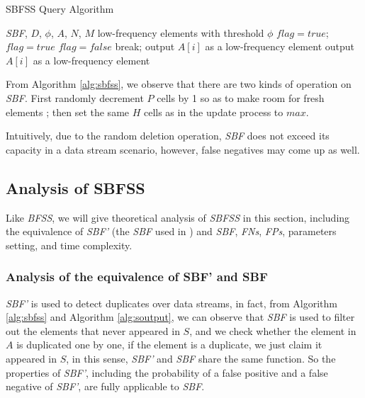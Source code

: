 \documentclass[conference]{IEEEtran}
\begin{document}
\begin{algorithm}[h]
	\caption{SBFSS Query Algorithm}
	\label{alg:soutput}
	\begin{algorithmic}[1]
		\REQUIRE \emph{SBF}, $D$, $\phi$, $A$, $N$, $M$
		\ENSURE low-frequency elements with threshold $\phi$
		\STATE $flag=true$; 
		\STATE $flag=true$
		\STATE $flag=false$
		\STATE break;
		\ENDIF
		\ENDFOR
		\STATE output $A[i]$ as a low-frequency element
		\ENDIF
		\ELSE
		\STATE output $A[i]$ as a low-frequency element
		\ENDIF
		\ENDIF
		\ENDFOR
	\end{algorithmic}
\end{algorithm}

From Algorithm \ref{alg:sbfss}, we observe that there are two kinds of operation on \emph{SBF}. First randomly decrement $P$ cells by 1 so as to make room for fresh elements
; then set the same $H$ cells as in the update process to $max$.\par 
Intuitively, due to the random deletion operation, \emph{SBF} does not exceed its capacity in a data stream scenario, however, false negatives may come up as well.

\subsection{Analysis of SBFSS}
Like \emph{BFSS}, we will give theoretical analysis of \emph{SBFSS} in this section, including the equivalence of \emph{SBF'} (the \emph{SBF} used in \cite{IEEEexample:sbf}) and \emph{SBF}, \emph{FNs}, \emph{FPs}, parameters setting, and time complexity.\par
\subsubsection{\textbf{Analysis of the equivalence of SBF' and SBF}}
\emph{SBF'} is used to detect duplicates over data streams, in fact, from Algorithm \ref{alg:sbfss} and Algorithm \ref{alg:soutput}, we can observe that \emph{SBF} is used to filter out the elements that never appeared in $S$, and we check whether the element in $A$ is duplicated one by one, if the element is a duplicate, we just claim it appeared in $S$, in this sense, \emph{SBF'} and \emph{SBF} share the same function. So the properties of \emph{SBF'}, including the probability of a false positive and a false negative of \emph{SBF'}, are fully applicable to \emph{SBF}.\par
\end{document}
